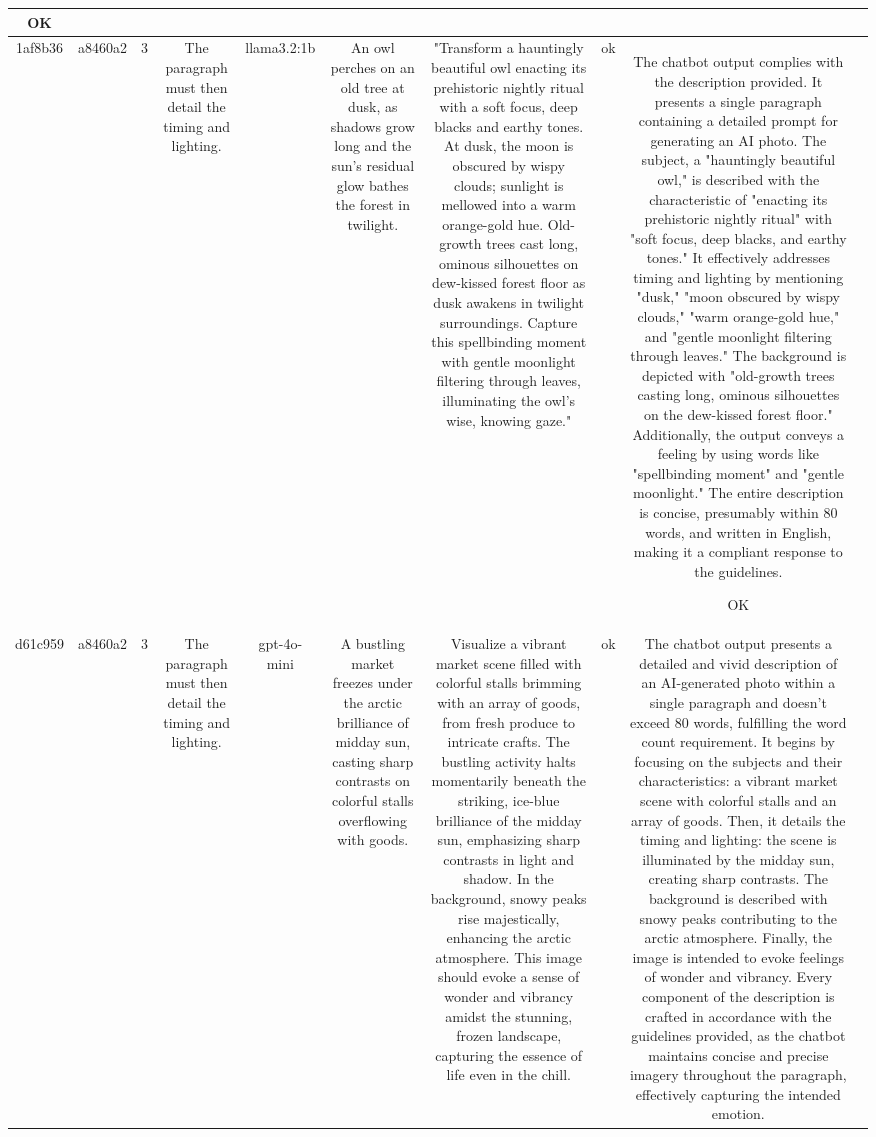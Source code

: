 \begin{table}[h!]
\begin{tabular}{|c|c|c|c|c|c|c|c|c|c|}
OK & \\
\hline
1af8b36 & a8460a2 & 3 & The paragraph must then detail the timing and lighting. & llama3.2:1b & An owl perches on an old tree at dusk, as shadows grow long and the sun's residual glow bathes the forest in twilight. & "Transform a hauntingly beautiful owl enacting its prehistoric nightly ritual with a soft focus, deep blacks and earthy tones. At dusk, the moon is obscured by wispy clouds; sunlight is mellowed into a warm orange-gold hue. Old-growth trees cast long, ominous silhouettes on dew-kissed forest floor as dusk awakens in twilight surroundings. Capture this spellbinding moment with gentle moonlight filtering through leaves, illuminating the owl's wise, knowing gaze." & ok & The chatbot output complies with the description provided. It presents a single paragraph containing a detailed prompt for generating an AI photo. The subject, a "hauntingly beautiful owl," is described with the characteristic of "enacting its prehistoric nightly ritual" with "soft focus, deep blacks, and earthy tones." It effectively addresses timing and lighting by mentioning "dusk," "moon obscured by wispy clouds," "warm orange-gold hue," and "gentle moonlight filtering through leaves." The background is depicted with "old-growth trees casting long, ominous silhouettes on the dew-kissed forest floor." Additionally, the output conveys a feeling by using words like "spellbinding moment" and "gentle moonlight." The entire description is concise, presumably within 80 words, and written in English, making it a compliant response to the guidelines.

OK & \\
\hline
d61c959 & a8460a2 & 3 & The paragraph must then detail the timing and lighting. & gpt-4o-mini & A bustling market freezes under the arctic brilliance of midday sun, casting sharp contrasts on colorful stalls overflowing with goods. & Visualize a vibrant market scene filled with colorful stalls brimming with an array of goods, from fresh produce to intricate crafts. The bustling activity halts momentarily beneath the striking, ice-blue brilliance of the midday sun, emphasizing sharp contrasts in light and shadow. In the background, snowy peaks rise majestically, enhancing the arctic atmosphere. This image should evoke a sense of wonder and vibrancy amidst the stunning, frozen landscape, capturing the essence of life even in the chill. & ok & The chatbot output presents a detailed and vivid description of an AI-generated photo within a single paragraph and doesn't exceed 80 words, fulfilling the word count requirement. It begins by focusing on the subjects and their characteristics: a vibrant market scene with colorful stalls and an array of goods. Then, it details the timing and lighting: the scene is illuminated by the midday sun, creating sharp contrasts. The background is described with snowy peaks contributing to the arctic atmosphere. Finally, the image is intended to evoke feelings of wonder and vibrancy. Every component of the description is crafted in accordance with the guidelines provided, as the chatbot maintains concise and precise imagery throughout the paragraph, effectively capturing the intended emotion.


\end{tabular}
\end{table}
